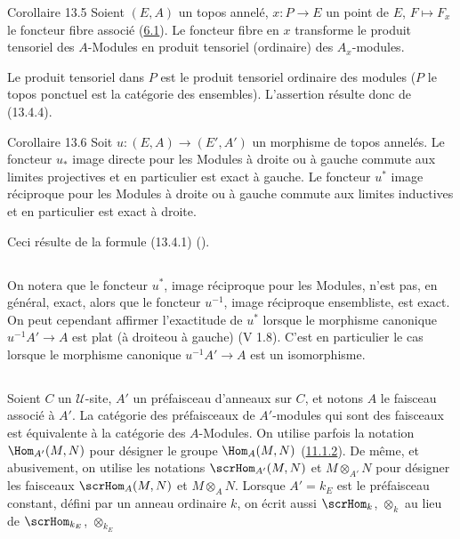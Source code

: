 \documentclass[10pt]{../fichiers-configuration-latex/smfart}
\begin{document}
\begin{enonce*}{Corollaire 13.5}
Soient $(E,A)$ un topos annelé, $x:P\rightarrow E$ un point de $E$,
$F\mapsto F_x$ le foncteur fibre associé (\hyperref[IV.def6.1]{6.1}). Le
foncteur fibre en $x$ transforme le produit tensoriel des
$A$-Modules en produit tensoriel (ordinaire) des $A_x$-modules.
\end{enonce*}

Le produit tensoriel dans $P$ est le produit tensoriel ordinaire des
modules ($P$ le topos ponctuel est la catégorie des ensembles).
L'assertion résulte donc de (13.4.4).

\begin{enonce*}{Corollaire 13.6}
Soit $u:(E,A)\rightarrow (E',A')$ un morphisme de topos annelés. Le
foncteur $u_{\ast}$ image directe pour les Modules à droite ou à
gauche commute aux limites projectives et en particulier est exact à
gauche. Le foncteur $u^{\ast}$ image réciproque pour les Modules à
droite ou à gauche commute aux limites inductives et en particulier
est exact à droite.
\end{enonce*}

Ceci résulte de la formule (13.4.1) ().

\setcounter{subsection}{6}
\subsection{}
On notera que le foncteur $u^{\ast}$, image réciproque pour les
Modules, n'est pas, en général, exact, alors que le foncteur
$u^{-1}$, image réciproque ensembliste, est exact. On peut cependant
affirmer l'exactitude de $u^{\ast}$ lorsque le morphisme canonique
$u^{-1}A'\rightarrow A$ est plat (à droite\pageoriginale ou à
gauche) (V 1.8). C'est en particulier le cas lorsque le morphisme
canonique $u^{-1}A'\rightarrow A$ est un isomorphisme.

\subsection{}
Soient $C$ un $𝒰$-site, $A'$ un préfaisceau d'anneaux sur
$C$, et notons $A$ le faisceau associé à $A'$. La catégorie des
préfaisceaux de $A'$-modules qui sont des faisceaux est équivalente
à la catégorie des $A$-Modules. On utilise parfois la notation
$\Hom_{A'}(M,N)$ pour désigner le groupe $\Hom_A(M,N)$
(\hyperref[IV.subsubsec11.1.2]{11.1.2}). De même, et abusivement, on utilise les
notations $\scrHom_{A'}(M,N)$ et $M\otimes_{A'}N$ pour désigner les
faisceaux $\scrHom_A(M,N)$ et $M\otimes_A N$. Lorsque $A'=k_E$ est
le préfaisceau constant, défini par un anneau ordinaire $k$, on
écrit aussi $\scrHom_k$, $\otimes_k$ au lieu de $\scrHom_{k_E}$,
$\otimes_{k_E}$
\end{document}
